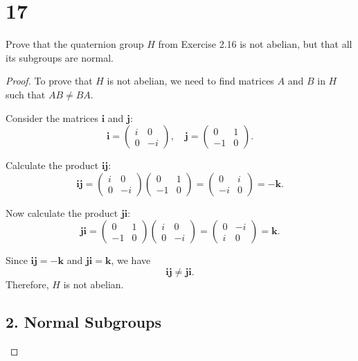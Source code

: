 \documentclass{article}
\begin{document}
\section*{17}
Prove that the quaternion group $H$ from Exercise 2.16 is not abelian, but that all its subgroups are normal.
\begin{proof}
    To prove that \( H \) is not abelian, we need to find matrices \( A \) and \( B \) in \( H \) such that \( AB \neq BA \).

Consider the matrices \( \mathbf{i} \) and \( \mathbf{j} \):
\[
\mathbf{i} = \begin{pmatrix} i & 0 \\ 0 & -i \end{pmatrix}, \quad
\mathbf{j} = \begin{pmatrix} 0 & 1 \\ -1 & 0 \end{pmatrix}.
\]

Calculate the product \( \mathbf{i} \mathbf{j} \):
\[
\mathbf{i} \mathbf{j} = \begin{pmatrix} i & 0 \\ 0 & -i \end{pmatrix} \begin{pmatrix} 0 & 1 \\ -1 & 0 \end{pmatrix} = \begin{pmatrix} 0 & i \\ -i & 0 \end{pmatrix} = -\mathbf{k}.
\]

Now calculate the product \( \mathbf{j} \mathbf{i} \):
\[
\mathbf{j} \mathbf{i} = \begin{pmatrix} 0 & 1 \\ -1 & 0 \end{pmatrix} \begin{pmatrix} i & 0 \\ 0 & -i \end{pmatrix} = \begin{pmatrix} 0 & -i \\ i & 0 \end{pmatrix} = \mathbf{k}.
\]

Since \( \mathbf{i} \mathbf{j} = -\mathbf{k} \) and \( \mathbf{j} \mathbf{i} = \mathbf{k} \), we have
\[
\mathbf{i} \mathbf{j} \neq \mathbf{j} \mathbf{i}.
\]
Therefore, \( H \) is not abelian.

\subsection*{2. Normal Subgroups}


\end{proof}
\end{document}
